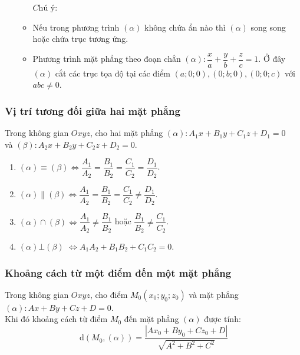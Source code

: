 \begin{tomtat}
\begin{itemize}
\begin{itemize}
\begin{center}
		\end{center} 
		$\textit{Chú ý}$:
		\item Nếu trong phương trình $(\alpha)$ không chứa ẩn nào thì $(\alpha)$ song song hoặc chứa trục tương ứng.
		\item Phương trình mặt phẳng theo đoạn chắn $\left(\alpha\right):\dfrac{x}{a}+\dfrac{y}{b}+\dfrac{z}{c}=1$. Ở đây $(\alpha)$ cắt các trục tọa độ tại các điểm $(a;0;0), (0;b;0), (0;0;c)$ với $abc\neq 0$.
	\end{itemize}
\end{itemize}
\subsubsection{Vị trí tương đối giữa hai mặt phẳng}
Trong không gian $Oxyz$, cho hai mặt phẳng
$(\alpha )\colon A_1x+B_1y+C_1z+D_1=0$ \\
và $(\beta )\colon A_2x+B_2y+C_2z+D_2=0$.
\begin{enumerate}
	\item $(\alpha   )\equiv  (\beta ) $$\Leftrightarrow \dfrac{A_1}{A_2} =\dfrac{B_1}{B_2}=\dfrac{C_1}{C_2}=\dfrac{D_1}{D_2}$.
	\item $(\alpha   )\parallel  (\beta ) $$\Leftrightarrow \dfrac{A_1}{A_2} =\dfrac{B_1}{B_2}=\dfrac{C_1}{C_2}\ne \dfrac{D_1}{D_2}$.
	\item $(\alpha )\cap (\beta )$$\Leftrightarrow  \dfrac{A_1}{A_2} \ne \dfrac{B_1}{B_2}$ hoặc $\dfrac{B_1}{B_2}\ne \dfrac{C_1}{C_2}$.
	\item $(\alpha ) \bot  (\beta )$ $\Leftrightarrow A_1A_2+B_1B_2+C_1C_2=0$.
\end{enumerate}
\subsubsection{Khoảng cách từ một điểm đến một mặt phẳng}
 Trong không gian $Oxyz$, cho điểm $M_0(x_0;y_0;z_0) $ và mặt phẳng $\left(\alpha\right):Ax+By+Cz+D=0$. \\Khi đó khoảng cách từ điểm $M_0$ đến mặt phẳng $(\alpha)$ được tính:\\
	$$\boxed{\mathrm{\,d}\left(M_0,\left(\alpha\right)\right)=\dfrac{\left|Ax_0+By_0+Cz_0+D\right|}{\sqrt{A^2+B^2+C^2}}}$$


\end{tomtat}
